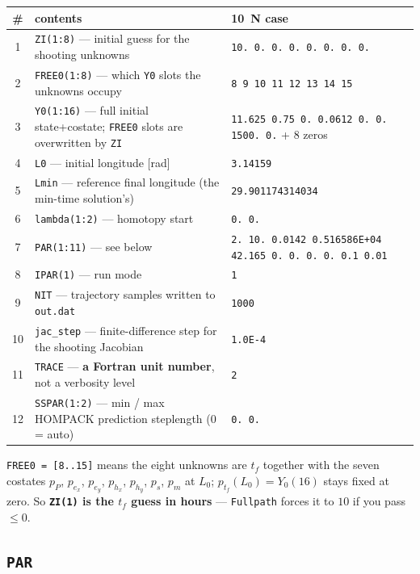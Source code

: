 \documentclass[11pt]{article}
\newcommand{\code}[1]{\texttt{\small #1}}
\newcommand{\file}[1]{\texttt{\small #1}}
\begin{document}
\begin{center}
\footnotesize
\begin{tabular}{@{}c p{6.2cm} p{8.3cm}@{}}
\toprule
\# & contents & 10~N case\\
\midrule
1 & \code{ZI(1:8)} --- initial guess for the shooting unknowns &
\code{10. 0. 0. 0. 0. 0. 0. 0.}\\
2 & \code{FREE0(1:8)} --- which \code{Y0} slots the unknowns occupy &
\code{8 9 10 11 12 13 14 15}\\
3 & \code{Y0(1:16)} --- full initial state+costate; \code{FREE0} slots are
overwritten by \code{ZI} &
\code{11.625 0.75 0. 0.0612 0. 0. 1500. 0.} + 8 zeros\\
4 & \code{L0} --- initial longitude [rad] & \code{3.14159}\\
5 & \code{Lmin} --- reference final longitude (the min-time solution's) &
\code{29.901174314034}\\
6 & \code{lambda(1:2)} --- homotopy start & \code{0. 0.}\\
7 & \code{PAR(1:11)} --- see below &
\code{2. 10. 0.0142 0.516586E+04 42.165 0. 0. 0. 0. 0.1 0.01}\\
8 & \code{IPAR(1)} --- run mode & \code{1}\\
9 & \code{NIT} --- trajectory samples written to \file{out.dat} &
\code{1000}\\
10 & \code{jac\_step} --- finite-difference step for the shooting Jacobian &
\code{1.0E-4}\\
11 & \code{TRACE} --- \textbf{a Fortran unit number}, not a verbosity level &
\code{2}\\
12 & \code{SSPAR(1:2)} --- min / max HOMPACK prediction steplength (0 = auto) &
\code{0. 0.}\\
\bottomrule
\end{tabular}
\end{center}

\noindent
\code{FREE0 = [8..15]} means the eight unknowns are $t_f$ together with the
seven costates $p_P$, $p_{e_x}$, $p_{e_y}$, $p_{h_x}$, $p_{h_y}$, $p_s$, $p_m$ at $L_0$;
$p_{t_f}(L_0) = Y_0(16)$ stays fixed at zero. So \textbf{\code{ZI(1)} is the
$t_f$ guess in hours} --- \code{Fullpath} forces it to $10$ if you pass
$\le 0$.

\subsection{\code{PAR}}
\end{document}
